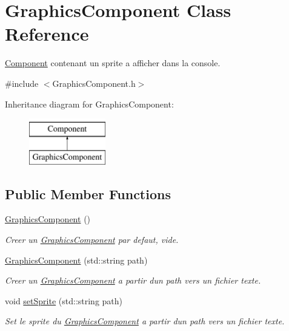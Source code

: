 \hypertarget{class_graphics_component}{}\section{Graphics\+Component Class Reference}
\label{class_graphics_component}


\hyperlink{class_component}{Component} contenant un sprite a afficher dans la console.  




{\ttfamily \#include $<$Graphics\+Component.\+h$>$}

Inheritance diagram for Graphics\+Component\+:\begin{figure}[H]
\begin{center}
\leavevmode
\includegraphics[height=2.000000cm]{class_graphics_component}
\end{center}
\end{figure}
\subsection*{Public Member Functions}
\begin{DoxyCompactItemize}
\item 
\hypertarget{class_graphics_component_a67fc1b715989a5e18d32e26b27a55c50}{}\label{class_graphics_component_a67fc1b715989a5e18d32e26b27a55c50} 
\hyperlink{class_graphics_component_a67fc1b715989a5e18d32e26b27a55c50}{Graphics\+Component} ()
\begin{DoxyCompactList}\small\item\em Creer un \hyperlink{class_graphics_component}{Graphics\+Component} par defaut, vide. \end{DoxyCompactList}\item 
\hyperlink{class_graphics_component_af9c775bcb7f51c76c25d32b3152cd5b2}{Graphics\+Component} (std\+::string path)
\begin{DoxyCompactList}\small\item\em Creer un \hyperlink{class_graphics_component}{Graphics\+Component} a partir d\textquotesingle{}un path vers un fichier texte. \end{DoxyCompactList}\item 
void \hyperlink{class_graphics_component_ab3e309ee0a8dcbc1b927d38bf2e1d8c9}{set\+Sprite} (std\+::string path)
\begin{DoxyCompactList}\small\item\em Set le sprite du \hyperlink{class_graphics_component}{Graphics\+Component} a partir d\textquotesingle{}un path vers un fichier texte. \end{DoxyCompactList}\end{DoxyCompactItemize}
